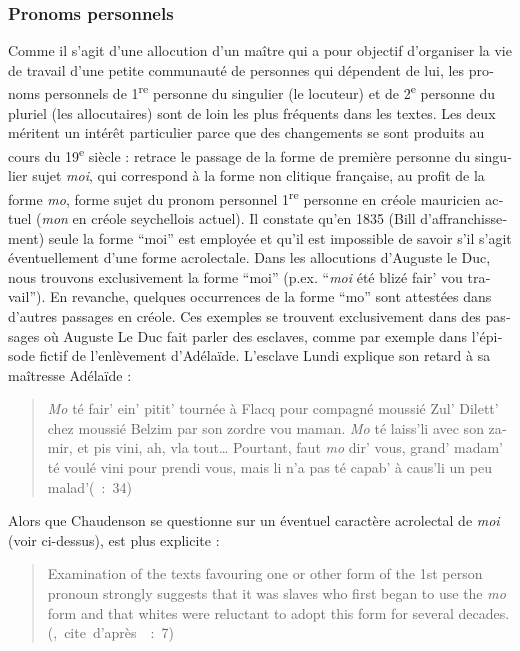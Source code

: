 \documentclass[output=paper]{langscibook}
\begin{document}
\begin{otherlanguage}{french}
\subsubsection{Pronoms personnels}

Comme il s’agit d’une allocution d’un maître qui a pour objectif d’organiser la vie de travail d’une petite communauté de personnes qui dépendent de lui, les pronoms personnels de 1\textsuperscript{re} personne du singulier (le locuteur) et de 2\textsuperscript{e} personne du pluriel (les allocutaires) sont de loin les plus fréquents dans les textes. Les deux méritent un intérêt particulier parce que des changements se sont produits au cours du 19\textsuperscript{e} siècle : \citet[187]{Chaudenson1981} retrace le passage de la forme de première personne du singulier sujet \textit{moi}, qui correspond à la forme non clitique française, au profit de la forme \textit{mo}, forme sujet du pronom personnel 1\textsuperscript{re} personne en créole mauricien actuel (\textit{mon} en créole seychellois actuel). Il constate qu’en 1835 (Bill d’affranchissement) seule la forme “moi” est employée et qu’il est impossible de savoir s’il s’agit éventuellement d’une forme acrolectale. Dans les allocutions d’Auguste le Duc, nous trouvons exclusivement la forme “moi” (p.ex. “\textit{moi} été blizé fair’ vou travail”). En revanche, quelques occurrences de la forme “mo” sont attestées dans d’autres passages en créole. Ces exemples se trouvent exclusivement dans des passages où Auguste Le Duc fait parler des esclaves, comme par exemple dans l’épisode fictif de l’enlèvement d’Adélaïde. L’esclave Lundi explique son retard à sa maîtresse Adélaïde : 

\begin{quote}
\textit{Mo} té fair’ ein’ pitit’ tournée à Flacq pour compagné moussié Zul’ Dilett’ chez moussié Belzim par son zordre vou maman. \textit{Mo} té laiss’li avec son zamir, et pis vini, ah, vla tout… Pourtant, faut \textit{mo} dir’ vous, grand’ madam’ té voulé vini pour prendi vous, mais li n’a pas té capab’ à caus’li un peu malad’\hbox{}\hfill\hbox{(\citealt{Pourcelet1994} : 34)}
\end{quote}

Alors que Chaudenson se questionne sur un éventuel caractère acrolectal de \textit{moi} (voir ci-dessus), \citet{Baker1976} est plus explicite :

\begin{quote}
Examination of the texts favouring one or other form of the 1st person pronoun strongly suggests that it was slaves who first began to use the \textit{mo} form and that whites were reluctant to adopt this form for several decades.\\\hbox{}\hfill\hbox{(\citealt[46–48]{Baker1976}, cite d’après \citealt{BakerEtAl2007} : 7)}
\end{quote}


\end{otherlanguage}
\end{document}
